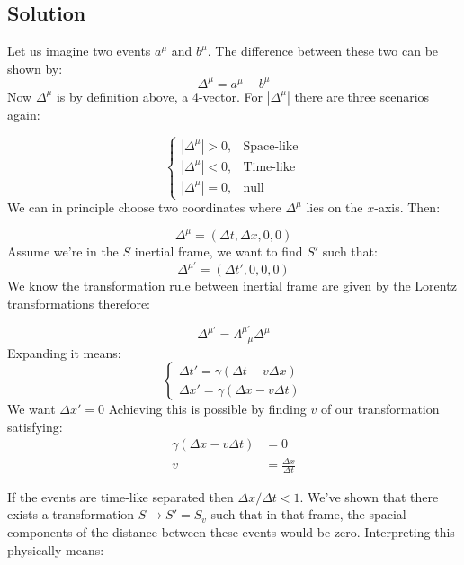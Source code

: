 \documentclass[10pt,twocoloumn]{article}
\begin{document}
\subsection*{Solution}
Let us imagine two events $a^\mu$ and $b^\mu$. The difference between these two can be shown by:
\begin{equation}
\Delta^\mu = a^\mu - b^\mu
\end{equation}
Now $\Delta^\mu$ is by definition above, a 4-vector. For $|\Delta^\mu|$ there are three scenarios again:

\begin{equation}
\begin{cases}
|\Delta^\mu| > 0, &\text{Space-like}\\
|\Delta^\mu| < 0 , &\text{Time-like}\\
|\Delta^\mu| = 0 , &\text{null}
\end{cases}
\end{equation}
We can in principle choose two coordinates where $\Delta^\mu$ lies on the $x$-axis. Then:

\begin{equation}
\Delta^\mu = (\Delta t , \Delta x , 0,0)
\end{equation}
Assume we're in the $S$ inertial frame, we want to find $S'$ such that:
\begin{equation}
\Delta^{\mu'} = (\Delta t',0,0,0)
\end{equation}
We know the transformation rule between inertial frame are given by the Lorentz transformations therefore:

\begin{equation}
\Delta^{\mu'}= \Lambda^{\mu'}_{\ \ \ \mu} \Delta^{\mu}
\end{equation}
Expanding it means:
\begin{equation}
\begin{cases}
\Delta t' = \gamma(\Delta t  - v \Delta x) \\
\Delta x' = \gamma (\Delta x - v \Delta t)
\end{cases}
\end{equation}
We want $\Delta x' = 0$
Achieving this is possible by finding $v$ of our transformation satisfying:
\begin{align}
\gamma (\Delta x - v\Delta t) &= 0\\
v &= \frac{\Delta x}{\Delta t}
\end{align}

If the events are time-like separated then $\Delta x / \Delta t < 1$. We've shown that there exists a transformation $S \rightarrow S' = S_v$ such that in that frame, the spacial components of the distance between these events would be zero. Interpreting this physically means:
\end{document}
